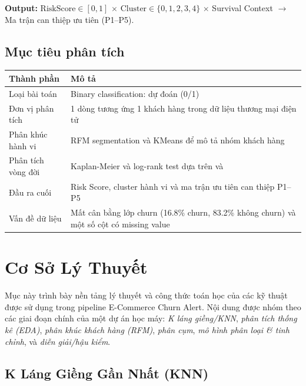 \documentclass[12pt,a4paper]{article}
\newcommand{\code}[1]{\begingroup\small\ttfamily\seqsplit{#1}\endgroup}
\begin{document}
\textbf{Output:} $\text{RiskScore} \in [0,1]$ $\times$ $\text{Cluster} \in \{0,1,2,3,4\}$ $\times$
Survival Context $\to$ Ma trận can thiệp ưu tiên (P1--P5).

\subsection*{Mục tiêu phân tích}

\begin{center}
\begin{tabularx}{\textwidth}{lX}
  \toprule
  \textbf{Thành phần} & \textbf{Mô tả} \\
  \midrule
  Loại bài toán      & Binary classification: dự đoán \code{Churn} (0/1) \\
  Đơn vị phân tích   & 1 dòng tương ứng 1 khách hàng trong dữ liệu thương mại điện tử \\
  Phân khúc hành vi  & RFM segmentation và KMeans để mô tả nhóm khách hàng \\
  Phân tích vòng đời & Kaplan-Meier và log-rank test dựa trên \code{Tenure} và \code{Churn} \\
  Đầu ra cuối        & Risk Score, cluster hành vi và ma trận ưu tiên can thiệp P1--P5 \\
  Vấn đề dữ liệu     & Mất cân bằng lớp churn (16.8\% churn, 83.2\% không churn) và một số cột có missing value \\
  \bottomrule
\end{tabularx}
\end{center}

\section{Cơ Sở Lý Thuyết}
\label{sec:theory}

Mục này trình bày nền tảng lý thuyết và công thức toán học của các kỹ thuật được sử dụng trong
pipeline E-Commerce Churn Alert. Nội dung được nhóm theo các giai đoạn chính của một dự án học máy:
\textit{K láng giềng/KNN}, \textit{phân tích thống kê (EDA)}, \textit{phân khúc khách hàng (RFM)},
\textit{phân cụm}, \textit{mô hình phân loại \& tinh chỉnh}, và \textit{diễn giải/hậu kiểm}.

\subsection{K Láng Giềng Gần Nhất (KNN)}
\end{document}
